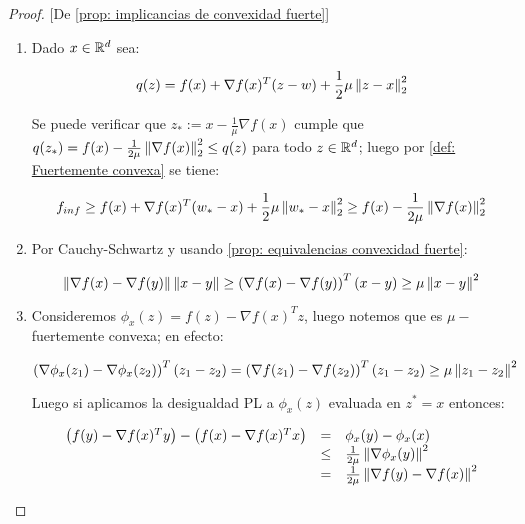\begin{proof}{[De \ref{prop: implicancias de convexidad fuerte}]}
	\begin{enumerate}
		\item Dado $x \in {\mathbb{R}}^d$ sea:
		
		\begin{equation*}
		q(z) = f(x) + \nabla f(x)^T (z-w) + \frac{1}{2} \mu \left\lVert z-x\right\rVert_2^2
		\end{equation*}
		
		Se puede verificar que $z_* := x - \frac{1}{\mu} \nabla f(x)$ cumple que $q(z_*) = f(x) - \frac{1}{2\mu} \left\lVert\nabla f(x)\right\rVert_2^2 \leq q(z)$ para todo $z \in {\mathbb{R}}^d$; luego por \ref{def: Fuertemente convexa} se tiene:
		
		\begin{equation*}
		f_{inf} \geq f(x) + \nabla f(x)^T (w_*-x) + \frac{1}{2} \mu \left\lVert w_*-x\right\rVert_2^2 \geq f(x) - \frac{1}{2\mu} \left\lVert\nabla f(x)\right\rVert_2^2 
		\end{equation*}
		
		\item Por Cauchy-Schwartz y usando \ref{prop: equivalencias convexidad fuerte}:
		
		\begin{equation*}
			\left\lVert\nabla f(x) - \nabla f(y)\right\rVert \left\lVert x-y\right\rVert \geq \left(\nabla f(x) - \nabla f(y)\right)^T \left(x-y\right) \geq \mu \left\lVert x-y\right\rVert^2
		\end{equation*}
		
		\item Consideremos $\phi_x(z) = f(z) - \nabla f(x)^T z$, luego notemos que es $\mu-$fuertemente convexa; en efecto:
		
		\begin{equation*}
			\left(\nabla \phi_x(z_1) - \nabla \phi_x(z_2)\right)^T \left(z_1 - z_2\right) = \left(\nabla f(z_1) - \nabla f(z_2)\right)^T \left(z_1 - z_2\right) \geq \mu \left\lVert z_1 - z_2\right\rVert^2
		\end{equation*}
		
		Luego si aplicamos la desigualdad PL a $\phi_x(z)$ evaluada en $z^* = x$ entonces:
		
		\begin{equation*}
			\begin{array}{rcl}
			\left(f(y) - \nabla f(x)^T y\right) - \left(f(x) - \nabla f(x)^T x\right) & = &  \phi_x(y) - \phi_x(x)\\
			& \leq  & \frac{1}{2 \mu} \left\lVert\nabla \phi_x(y)\right\rVert^2 \\
			& = & \frac{1}{2 \mu} \left\lVert\nabla f(y) - \nabla f(x)\right\rVert^2 
			\end{array}
		\end{equation*}
		

\end{enumerate}
\end{proof}
